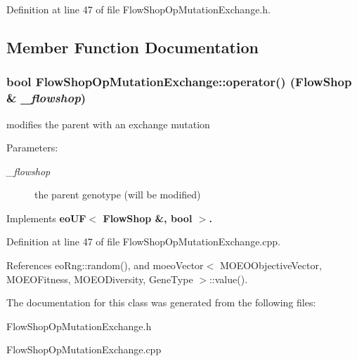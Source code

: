 Definition at line 47 of file Flow\-Shop\-Op\-Mutation\-Exchange.h.

\subsection{Member Function Documentation}
\subsubsection{\setlength{\rightskip}{0pt plus 5cm}bool Flow\-Shop\-Op\-Mutation\-Exchange::operator() (\bf{Flow\-Shop} \& {\em \_\-flowshop})\hspace{0.3cm}{\tt  [virtual]}}\label{classFlowShopOpMutationExchange_bdb2e1d937d788c50f04226265c848bd}


modifies the parent with an exchange mutation 

\begin{Desc}
\item[Parameters:]
\begin{description}
\item[{\em \_\-flowshop}]the parent genotype (will be modified) \end{description}
\end{Desc}


Implements \bf{eo\-UF$<$ Flow\-Shop \&, bool $>$}.

Definition at line 47 of file Flow\-Shop\-Op\-Mutation\-Exchange.cpp.

References eo\-Rng::random(), and moeo\-Vector$<$ MOEOObjective\-Vector, MOEOFitness, MOEODiversity, Gene\-Type $>$::value().

The documentation for this class was generated from the following files:\begin{CompactItemize}
\item 
Flow\-Shop\-Op\-Mutation\-Exchange.h\item 
Flow\-Shop\-Op\-Mutation\-Exchange.cpp\end{CompactItemize}
